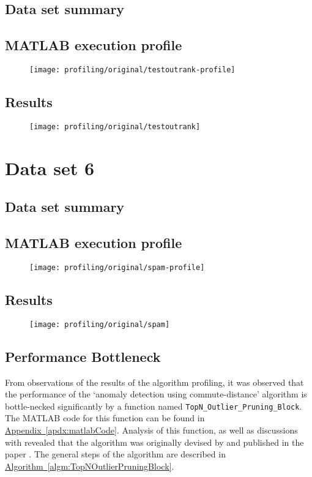 \subsection{Data set summary}

\subsection{MATLAB execution profile}
\begin{figure}[H]
	\centering
	\texttt{[image: profiling/original/testoutrank-profile]}
\end{figure}

\subsection{Results}
\begin{figure}[H]
	\centering
	\texttt{[image: profiling/original/testoutrank]}
\end{figure}


\section{Data set 6}

\subsection{Data set summary}

\subsection{MATLAB execution profile}
\begin{figure}[H]
	\centering
	\texttt{[image: profiling/original/spam-profile]}
\end{figure}

\subsection{Results}
\begin{figure}[H]
	\centering
	\texttt{[image: profiling/original/spam]}
\end{figure}

\subsection{Performance Bottleneck}
\label{sec:algorithmPerformanceBottleneck}
From observations of the results of the algorithm profiling, it was observed 
that the performance of the `anomaly detection using commute-distance' 
algorithm is bottle-necked significantly by a function named 
\verb+TopN_Outlier_Pruning_Block+. The MATLAB code for this function can be 
found in \hyperref[apdx:matlabCode]{Appendix~\ref{apdx:matlabCode}}. Analysis of
this function, as well as discussions with \citeauthor{Khoa:2012} revealed that
the algorithm was originally devised by \citeauthor{Bay:2003} and published in
the paper . The general steps of the algorithm are described
in \hyperref[algm:TopNOutlierPruningBlock]
{Algorithm~\ref{algm:TopNOutlierPruningBlock}}.

